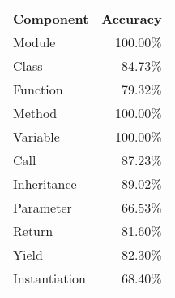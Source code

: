 \begin{tabularx}{\linewidth}{Xr}
\toprule
\textbf{Component} & \textbf{Accuracy} \\
\cmidrule{1-1}\cmidrule{2-2}
Module & 100.00\% \\
\cmidrule{1-1}\cmidrule{2-2}
Class & 84.73\% \\
\cmidrule{1-1}\cmidrule{2-2}
Function & 79.32\% \\
\cmidrule{1-1}\cmidrule{2-2}
Method & 100.00\% \\
\cmidrule{1-1}\cmidrule{2-2}
Variable & 100.00\% \\
\cmidrule{1-1}\cmidrule{2-2}
Call & 87.23\% \\
\cmidrule{1-1}\cmidrule{2-2}
Inheritance & 89.02\% \\
\cmidrule{1-1}\cmidrule{2-2}
Parameter & 66.53\% \\
\cmidrule{1-1}\cmidrule{2-2}
Return & 81.60\% \\
\cmidrule{1-1}\cmidrule{2-2}
Yield & 82.30\% \\
\cmidrule{1-1}\cmidrule{2-2}
Instantiation & 68.40\% \\
\bottomrule
\end{tabularx}

